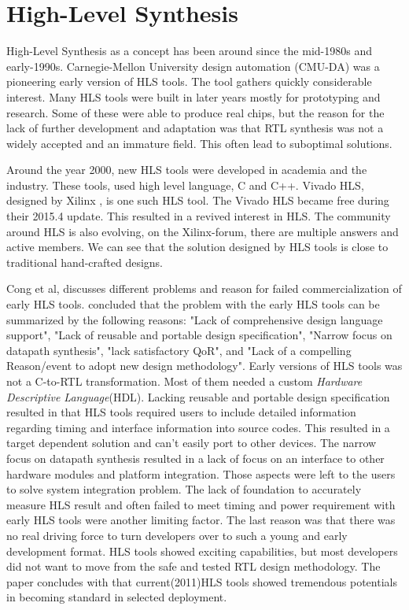 \section{High-Level Synthesis}
High-Level Synthesis as a concept has been around since the mid-1980s and early-1990s\cite{HLSTutorial}\citep{HLSPastFutur}. Carnegie-Mellon University design automation (CMU-DA)\citep{1085036}\citep{Parker:1979:CDA:800292.811694} was a pioneering early version of HLS tools. The tool gathers quickly considerable interest. Many HLS tools were built in later years mostly for prototyping and research\cite{Granacki:1985:AAD:317825.317970}\citep{Paulin:1986:HMA:318013.318055}\citep{4069894}. Some of these were able to produce real chips, but the reason for the lack of further development and adaptation was that RTL synthesis was not a widely accepted and an immature field. This often lead to suboptimal solutions. 

Around the year 2000, new HLS tools were developed in academia and the industry. These tools, used high level language, C and C++. Vivado HLS, designed by Xilinx \citep{6409453}, is one such HLS tool. The Vivado HLS became free during their 2015.4 update\citep{VIVADOHLS}. This resulted in a revived interest in HLS. The community around HLS is also evolving, on the Xilinx-forum, there are multiple answers and active members. We can see that the solution designed by HLS tools is close to traditional hand-crafted designs\citep{6718388}.

Cong et al,\cite{HLSTutorial} discusses different problems and reason for failed commercialization of early HLS tools.  concluded that the problem with the early HLS tools can be summarized by the following reasons: "Lack of comprehensive design language support", "Lack of reusable and portable design specification", "Narrow focus on datapath synthesis", "lack satisfactory QoR", and "Lack of a compelling Reason/event to adopt new design methodology".
 Early versions of HLS tools was not a C-to-RTL transformation. Most of them needed a custom \textit{Hardware Descriptive Language}(HDL). Lacking reusable and portable design specification resulted in that HLS tools required users to include detailed information regarding timing and interface information into source codes. This resulted in a target dependent solution and can't easily port to other devices. The narrow focus on datapath synthesis resulted in a lack of focus on an interface to other hardware modules and platform integration. Those aspects were left to the users to solve system integration problem. The lack of foundation to accurately measure HLS result and often failed to meet timing and power requirement with early HLS tools were another limiting factor. The last reason was that there was no real driving force to turn developers over to such a young and early development format. HLS tools showed exciting capabilities, but most developers did not want to move from the safe and tested RTL design methodology. The paper concludes with that current(2011)HLS tools showed tremendous potentials in becoming standard in selected deployment.

